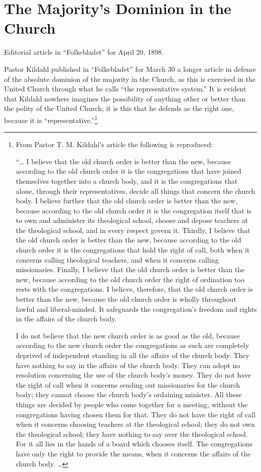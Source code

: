 
\section{The Majority’s Dominion in the Church}

Editorial article in “Folkebladet” for April 20, 1898.

Pastor Kildahl published in “Folkebladet” for March 30 a longer article in defense of the absolute dominion of the majority in the Church, as this is exercised in the United Church through what he calls “the representative system.” It is evident that Kildahl nowhere imagines the possibility of anything other or better than the polity of the United Church; it is this that he defends as the right one, because it is “representative.”\footnote{
From Pastor T. M. Kildahl’s article the following is reproduced:

“… I believe that the old church order is better than the new, because according to the old church order it is the congregations that have joined themselves together into a church body, and it is the congregations that alone, through their representatives, decide all things that concern the church body. I believe further that the old church order is better than the new, because according to the old church order it is the congregation itself that is to own and administer its theological school, choose and depose teachers at the theological school, and in every respect govern it. Thirdly, I believe that the old church order is better than the new, because according to the old church order it is the congregations that hold the right of call, both when it concerns calling theological teachers, and when it concerns calling missionaries. Finally, I believe that the old church order is better than the new, because according to the old church order the right of ordination too rests with the congregations. I believe, therefore, that the old church order is better than the new, because the old church order is wholly throughout lawful and liberal-minded. It safeguards the congregation’s freedom and rights in the affairs of the church body.

I do not believe that the new church order is as good as the old, because according to the new church order the congregations as such are completely deprived of independent standing in all the affairs of the church body. They have nothing to say in the affairs of the church body. They can adopt no resolution concerning the use of the church body’s money. They do not have the right of call when it concerns sending out missionaries for the church body; they cannot choose the church body’s ordaining minister. All these things are decided by people who come together for a meeting, without the congregations having chosen them for that. They do not have the right of call when it concerns choosing teachers at the theological school; they do not own the theological school; they have nothing to say over the theological school. For it all lies in the hands of a board which chooses itself. The congregations have only the right to provide the means, when it concerns the affairs of the church body. …

}
